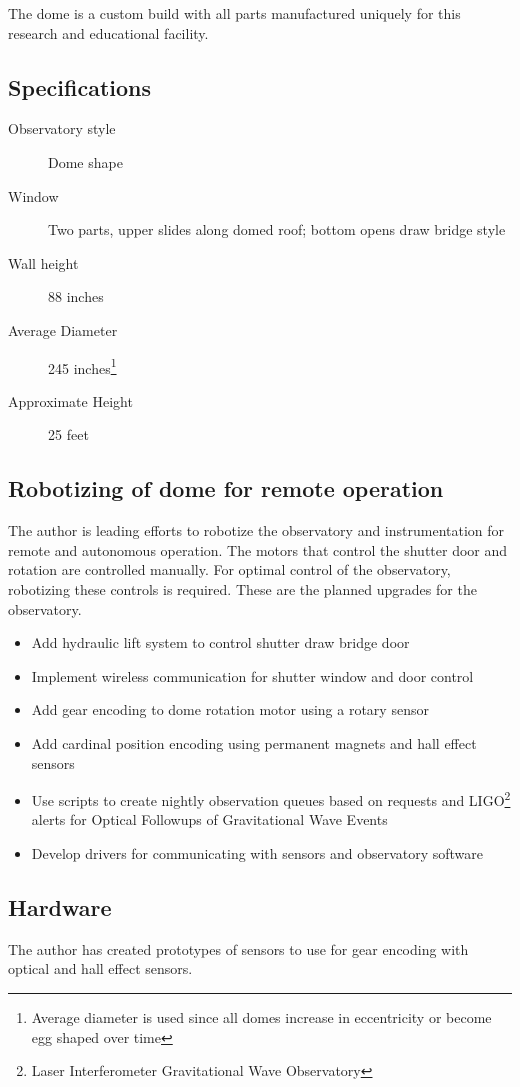 The dome is a custom build with all parts manufactured uniquely for this research and educational facility.

\subsection{Specifications}
\begin{description}
    \item[Observatory style] Dome shape
    \item[Window] Two parts, upper slides along domed roof; bottom opens draw bridge style
    \item[Wall height] 88 inches
    \item[Average Diameter] 245 inches\footnote{Average diameter is used since all domes increase in eccentricity or become egg shaped over time}
    \item[Approximate Height] 25 feet
\end{description}

\subsection{Robotizing of dome for remote operation}
The author is leading efforts to robotize the observatory and instrumentation for remote and autonomous operation.
The motors that control the shutter door and rotation are controlled manually.
For optimal control of the observatory, robotizing these controls is required.
These are the planned upgrades for the observatory.
\begin{itemize}
    \item Add hydraulic lift system to control shutter draw bridge door
    \item Implement wireless communication for shutter window and door control
    \item Add gear encoding to dome rotation motor using a rotary sensor
    \item Add cardinal position encoding using permanent magnets and hall effect sensors
    \item Use scripts to create nightly observation queues based on requests and LIGO\footnote{Laser Interferometer Gravitational Wave Observatory} alerts for Optical Followups of Gravitational Wave Events
    \item Develop drivers for communicating with sensors and observatory software
\end{itemize}

\subsection{Hardware}
The author has created prototypes of sensors to use for gear encoding with optical and hall effect sensors.

